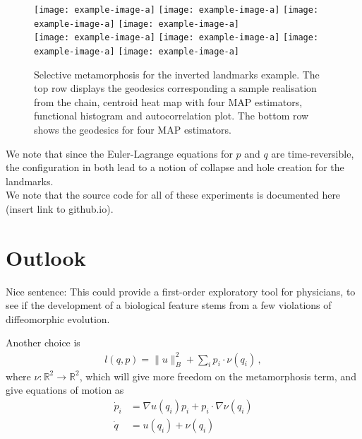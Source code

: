 \documentclass[runningheads]{llncs}
\begin{document}
\begin{figure}
\centering
\begin{minipage}{\textwidth}
  \centering
    \texttt{[image: example-image-a]}\quad
    \texttt{[image: example-image-a]}\quad
    \texttt{[image: example-image-a]}\quad
    \texttt{[image: example-image-a]}\\[0.25cm]
    \texttt{[image: example-image-a]}\quad
    \texttt{[image: example-image-a]}\quad
    \texttt{[image: example-image-a]}\quad
    \texttt{[image: example-image-a]}
    \caption{Selective metamorphosis for the inverted landmarks example. The top
    row displays the geodesics corresponding a sample realisation from the
    chain, centroid heat map with four MAP estimators, functional histogram and
    autocorrelation plot. The bottom row shows the geodesics for four MAP
    estimators.}
    \label{fig:selective:triangle}
\end{minipage}
\end{figure}

We note that since the Euler-Lagrange equations for $p$ and $q$ are
time-reversible, the configuration in both lead to a notion of
collapse and hole creation for the landmarks.\\



We note that the source code for all of these experiments is documented
here (insert link to github.io). 

\section{Outlook}\label{sec:outlook}

{\color{red} Nice sentence:} {\color{blue} This could provide a
first-order exploratory tool for physicians, to see if the development of a
biological feature stems from a few violations of diffeomorphic evolution.}


Another choice is 
\begin{align}
    l(q,p) = \|u\|_B^2 + \sum_i p_i\cdot \nu(q_i) \, , 
\end{align}
where $\nu:\mathbb R^2 \to \mathbb R^2$, which will give more freedom on the
metamorphosis term, and give equations of motion as \begin{align}
    \dot p_i  &= \nabla u(q_i)p_i  + p_i \cdot \nabla \nu(q_i)\\
    \dot q &= u(q_i) + \nu(q_i) 
\end{align}
\end{document}
